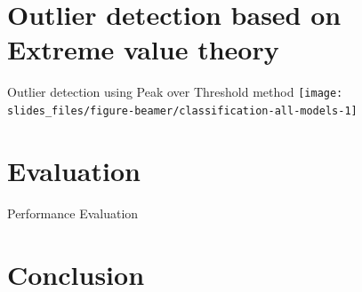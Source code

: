 \documentclass[14pt,ignorenonframetext,compress]{beamer}
\begin{document}
\hypertarget{outlier-detection-based-on-extreme-value-theory}{%
\section{Outlier detection based on Extreme value
theory}\label{outlier-detection-based-on-extreme-value-theory}}

\begin{frame}{Outlier detection using Peak over Threshold method}
\protect\hypertarget{outlier-detection-using-peak-over-threshold-method}{}
\texttt{[image: slides\_files/figure-beamer/classification-all-models-1]}
\end{frame}

\begin{frame}
\end{frame}

\hypertarget{evaluation}{%
\section{Evaluation}\label{evaluation}}

\begin{frame}{Performance Evaluation}
\protect\hypertarget{performance-evaluation}{}
\begin{table}
\centering\begingroup\fontsize{7}{9}\selectfont

\endgroup{}
\end{table}
\end{frame}

\hypertarget{conclusion}{%
\section{Conclusion}\label{conclusion}}
\end{document}
